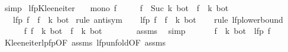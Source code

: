 \begin{isabellebody}
\ simp\isanewline
{}\isamarkupfalse%
%
\endisatagproof
{\isafoldproof}%
%
\isadelimproof
\isanewline
%
\endisadelimproof
\isanewline
{}\isamarkupfalse%
\ lfp{\isacharunderscore}{\kern0pt}Kleene{\isacharunderscore}{\kern0pt}iter{\isacharcolon}{\kern0pt}\isanewline
\ \ \ {\isachardoublequoteopen}mono\ f{\isachardoublequoteclose}\isanewline
\ \ \ \ \ {\isachardoublequoteopen}{\isacharparenleft}{\kern0pt}f\ {\isacharcircum}{\kern0pt}{\isacharcircum}{\kern0pt}\ Suc\ k{\isacharparenright}{\kern0pt}\ bot\ {\isacharequal}{\kern0pt}\ {\isacharparenleft}{\kern0pt}f\ {\isacharcircum}{\kern0pt}{\isacharcircum}{\kern0pt}\ k{\isacharparenright}{\kern0pt}\ bot{\isachardoublequoteclose}\isanewline
\ \ \ {\isachardoublequoteopen}lfp\ f\ {\isacharequal}{\kern0pt}\ {\isacharparenleft}{\kern0pt}f\ {\isacharcircum}{\kern0pt}{\isacharcircum}{\kern0pt}\ k{\isacharparenright}{\kern0pt}\ bot{\isachardoublequoteclose}\isanewline
%
\isadelimproof
%
\endisadelimproof
%
\isatagproof
{}\isamarkupfalse%
\ {\isacharparenleft}{\kern0pt}rule\ antisym{\isacharparenright}{\kern0pt}\isanewline
\ \ \isamarkupfalse%
\ {\isachardoublequoteopen}lfp\ f\ {\isasymle}\ {\isacharparenleft}{\kern0pt}f\ {\isacharcircum}{\kern0pt}{\isacharcircum}{\kern0pt}\ k{\isacharparenright}{\kern0pt}\ bot{\isachardoublequoteclose}\isanewline
\ \ \isamarkupfalse%
\ {\isacharparenleft}{\kern0pt}rule\ lfp{\isacharunderscore}{\kern0pt}lowerbound{\isacharparenright}{\kern0pt}\isanewline
\ \ \ \ \isamarkupfalse%
\ {\isachardoublequoteopen}f\ {\isacharparenleft}{\kern0pt}{\isacharparenleft}{\kern0pt}f\ {\isacharcircum}{\kern0pt}{\isacharcircum}{\kern0pt}\ k{\isacharparenright}{\kern0pt}\ bot{\isacharparenright}{\kern0pt}\ {\isasymle}\ {\isacharparenleft}{\kern0pt}f\ {\isacharcircum}{\kern0pt}{\isacharcircum}{\kern0pt}\ k{\isacharparenright}{\kern0pt}\ bot{\isachardoublequoteclose}\isanewline
\ \ \ \ \ \ \isamarkupfalse%
\ assms{\isacharparenleft}{\kern0pt}{}{\isacharparenright}{\kern0pt}\ \isamarkupfalse%
\ simp\isanewline
\ \ \isamarkupfalse%
\isanewline
\ \ \isamarkupfalse%
\ {\isachardoublequoteopen}{\isacharparenleft}{\kern0pt}f\ {\isacharcircum}{\kern0pt}{\isacharcircum}{\kern0pt}\ k{\isacharparenright}{\kern0pt}\ bot\ {\isasymle}\ lfp\ f{\isachardoublequoteclose}\isanewline
\ \ \ \ \isamarkupfalse%
\ Kleene{\isacharunderscore}{\kern0pt}iter{\isacharunderscore}{\kern0pt}lpfp{\isacharbrackleft}{\kern0pt}OF\ assms{\isacharparenleft}{\kern0pt}{}{\isacharparenright}{\kern0pt}{\isacharbrackright}{\kern0pt}\ lfp{\isacharunderscore}{\kern0pt}unfold{\isacharbrackleft}{\kern0pt}OF\ assms{\isacharparenleft}{\kern0pt}{}{\isacharparenright}{\kern0pt}{\isacharbrackright}{\kern0pt}\ \isamarkupfalse%

\end{isabellebody}
